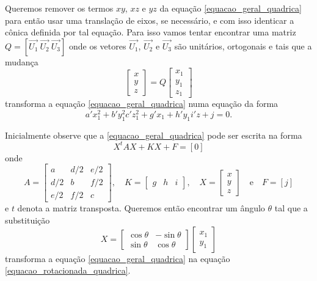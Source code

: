 Queremos remover os termos $xy$, $xz$ e $yz$ da equa\c{c}\~ao \eqref{equacao_geral_quadrica} para ent\~ao usar uma transla\c{c}\~ao de eixos, se necess\'ario, e com isso identicar a c\^onica definida por tal equa\c{c}\~ao. Para isso vamos tentar encontrar uma matriz $Q = [\vec{U_1}\ \vec{U_2}\ \vec{U_3}]$ onde os vetores $\vec{U_1}$, $\vec{U_2}$ e $\vec{U_3}$ s\~ao unit\'arios, ortogonais e tais que a mudan\c{c}a
\begin{equation}
	\begin{bmatrix}
		x\\
		y\\
		z
	\end{bmatrix} = Q \begin{bmatrix}
		x_1\\
		y_1\\
		z_1
	\end{bmatrix}
\end{equation}
transforma a equa\c{c}\~ao \eqref{equacao_geral_quadrica} numa equa\c{c}\~ao da forma
\begin{equation}\label{equacao_rotacionada_quadrica}
  a'x_1^2 + b'y_1^2 c'z_1^2 + g'x_1 + h'y_1 i'z + j = 0.
\end{equation}

Inicialmente observe que a \eqref{equacao_geral_quadrica} pode ser escrita na forma
\begin{equation}\label{equacao_matricial_quadrica}
  X^tAX + KX + F = [0]
\end{equation}
onde
\[
  A = \begin{bmatrix}
    a & d/2 & e/2\\
    d/2 & b & f/2\\
    e/2 & f/2 & c
  \end{bmatrix}
, \quad K = \begin{bmatrix}
  g & h & i
\end{bmatrix}, \quad X = \begin{bmatrix}
  x\\
  y\\
  z
\end{bmatrix}\quad\mbox{e}\quad F = [j]
\]
e $t$ denota a matriz transposta. Queremos ent\~ao encontrar um \^angulo $\theta$ tal que a substitui\c{c}\~ao
\begin{equation}\label{substituicao_rotacao_de_eixos_espaco}
  X = \begin{bmatrix}
    \cos\theta & -\sin\theta\\
    \sin\theta & \cos\theta
  \end{bmatrix}\begin{bmatrix}
    x_1\\y_1
  \end{bmatrix}
\end{equation}
transforma a equa\c{c}\~ao \eqref{equacao_geral_quadrica} na equa\c{c}\~ao \eqref{equacao_rotacionada_quadrica}.

